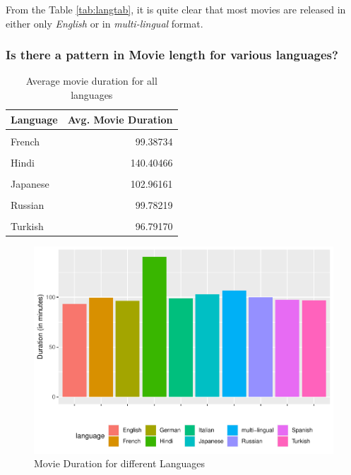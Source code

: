 \documentclass[11pt,a4paper,]{article}
\begin{document}
From the Table \ref{tab:langtab}, it is quite clear that most movies are released in either only \emph{English} or in \emph{multi-lingual} format.

\hypertarget{is-there-a-pattern-in-movie-length-for-various-languages}{%
\subsubsection{Is there a pattern in Movie length for various languages?}\label{is-there-a-pattern-in-movie-length-for-various-languages}}

\begin{table}[!h]

\caption{\label{tab:langtab2}Average movie duration for all languages}
\centering
\begin{tabular}[t]{l|r}
\hline
Language & Avg. Movie Duration\\
\hline
\cellcolor{gray!6}{English} & \cellcolor{gray!6}{93.50190}\\
\hline
French & 99.38734\\
\hline
\cellcolor{gray!6}{German} & \cellcolor{gray!6}{96.43831}\\
\hline
Hindi & 140.40466\\
\hline
\cellcolor{gray!6}{Italian} & \cellcolor{gray!6}{98.94191}\\
\hline
Japanese & 102.96161\\
\hline
\cellcolor{gray!6}{multi-lingual} & \cellcolor{gray!6}{106.46787}\\
\hline
Russian & 99.78219\\
\hline
\cellcolor{gray!6}{Spanish} & \cellcolor{gray!6}{97.35833}\\
\hline
Turkish & 96.79170\\
\hline
\end{tabular}
\end{table}

\begin{figure}[H]

{\centering \includegraphics{Report_files/figure-latex/langfig-1} 

}

\caption{Movie Duration for different Languages}\label{fig:langfig}
\end{figure}
\end{document}
